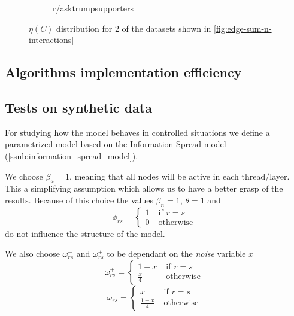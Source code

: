 \begin{figure}
\begin{center}
\begin{subfigure}[b]{0.4\textwidth}
			\caption{r/asktrumpsupporters}
			\label{fig:asktrump-hist-eta}
		\end{subfigure}
	\end{center}
	\caption{$\eta(C)$ distribution for $2$ of the datasets shown in
		\autoref{fig:edge-sum-n-interactions}}
	\label{fig:eta-distribution-content}
\end{figure}


\subsection{Algorithms implementation efficiency}%
\label{sub:algorithm_efficiency}


\subsection{Tests on synthetic data}%
\label{sub:testing_on_synthetic_data}

For studying how the model behaves in controlled situations we define a
parametrized model based on the Information Spread model
(\autoref{ssub:information_spread_model}).

We choose $\beta _{a} = 1$, meaning that all nodes will be active in each
thread/layer. This a
simplifying assumption which allows us to have a better grasp of the results.
Because of this choice the values $\beta _n = 1$, $\theta = 1$ and
\begin{equation}
	\phi_{rs}  =
	\begin{cases}
		1 \; & \text{if } r = s  \\
		0 \; & \text{otherwise }
	\end{cases}
\end{equation}
do not influence the structure of the model.

We also choose $\omega ^{-} _{rs}$ and $\omega ^{+} _{rs} $ to be dependant on
the \emph{noise} variable $x$
\begin{equation}
	\omega_{rs}^{+}   =
	\begin{cases}
		1 - x \;        & \text{if } r = s  \\
		\frac{x}{4}  \; & \text{otherwise }
	\end{cases}
\end{equation}
\begin{equation}
	\omega_{rs}^{-}   =
	\begin{cases}
		x \;                & \text{if } r = s  \\
		\frac{1 - x}{4}  \; & \text{otherwise }
	\end{cases}
\end{equation}

